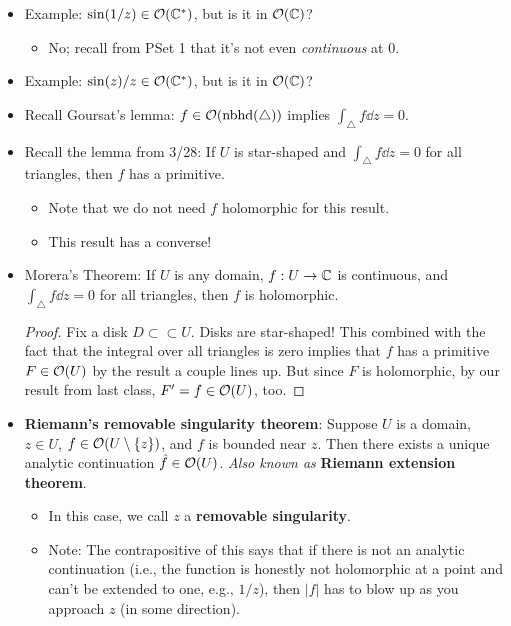 \documentclass[../notes.tex]{subfiles}
\begin{document}
\begin{itemize}
\begin{itemize}
    \end{itemize}
    \item Example: $\sin(1/z)\in\mathcal{O}(\mathbb{C}^*)$, but is it in $\mathcal{O}(\mathbb{C})$?
    \begin{itemize}
        \item No; recall from PSet 1 that it's not even \emph{continuous} at 0.
    \end{itemize}
    \item Example: $\sin(z)/z\in\mathcal{O}(\mathbb{C}^*)$, but is it in $\mathcal{O}(\mathbb{C})$?
    \item Recall Goursat's lemma: $f\in\mathcal{O}(\text{nbhd}(\triangle))$ implies $\int_\triangle f\dd{z}=0$.
    \item Recall the lemma from 3/28: If $U$ is star-shaped and $\int_\triangle f\dd{z}=0$ for all triangles, then $f$ has a primitive.
    \begin{itemize}
        \item Note that we do not need $f$ holomorphic for this result.
        \item This result has a converse!
    \end{itemize}
    \item Morera's Theorem: If $U$ is any domain, $f:U\to\mathbb{C}$ is continuous, and $\int_\triangle f\dd{z}=0$ for all triangles, then $f$ is holomorphic.
    \begin{proof}
        Fix a disk $D\subset\subset U$. Disks are star-shaped! This combined with the fact that the integral over all triangles is zero implies that $f$ has a primitive $F\in\mathcal{O}(U)$ by the result a couple lines up. But since $F$ is holomorphic, by our result from last class, $F'=f\in\mathcal{O}(U)$, too.
    \end{proof}
    \item \textbf{Riemann's removable singularity theorem}: Suppose $U$ is a domain, $z\in U$, $f\in\mathcal{O}(U\setminus\{z\})$, and $f$ is bounded near $z$. Then there exists a unique analytic continuation $\hat{f}\in\mathcal{O}(U)$. \emph{Also known as} \textbf{Riemann extension theorem}.
    \begin{itemize}
        \item In this case, we call $z$ a \textbf{removable singularity}.
        \item Note: The contrapositive of this says that if there is not an analytic continuation (i.e., the function is honestly not holomorphic at a point and can't be extended to one, e.g., $1/z$), then $|f|$ has to blow up as you approach $z$ (in some direction).
    \end{itemize}

\end{itemize}
\end{document}
